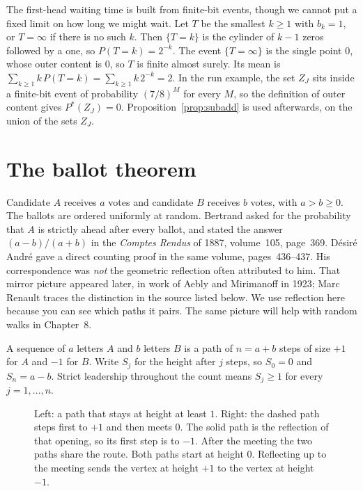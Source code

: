 The first-head waiting time is built from finite-bit events, though we cannot put a fixed limit on how long we might wait. Let $T$ be the smallest $k\ge1$ with $b_k=1$, or $T=\infty$ if there is no such $k$. Then $\{T=k\}$ is the cylinder of $k-1$ zeros followed by a one, so $P(T=k)=2^{-k}$. The event $\{T=\infty\}$ is the single point $0$, whose outer content is $0$, so $T$ is finite almost surely. Its mean is $\sum_{k\ge1}k\,P(T=k)=\sum_{k\ge1}k\,2^{-k}=2$. In the run example, the set $Z_J$ sits inside a finite-bit event of probability $(7/8)^M$ for every $M$, so the definition of outer content gives $P^*(Z_J)=0$. Proposition~\ref{prop:subadd} is used afterwards, on the union of the sets $Z_J$.

\section{The ballot theorem}

Candidate $A$ receives $a$ votes and candidate $B$ receives $b$ votes, with $a>b\ge0$. The ballots are ordered uniformly at random. Bertrand asked for the probability that $A$ is strictly ahead after every ballot, and stated the answer $(a-b)/(a+b)$ in the \emph{Comptes Rendus} of 1887, volume~105, page~369. D\'esir\'e Andr\'e gave a direct counting proof in the same volume, pages~436--437. His correspondence was \emph{not} the geometric reflection often attributed to him. That mirror picture appeared later, in work of Aebly and Mirimanoff in 1923; Marc Renault traces the distinction in the source listed below. We use reflection here because you can see which paths it pairs. The same picture will help with random walks in Chapter~8.

A sequence of $a$ letters $A$ and $b$ letters $B$ is a path of $n=a+b$ steps of size $+1$ for $A$ and $-1$ for $B$. Write $S_j$ for the height after $j$ steps, so $S_0=0$ and $S_n=a-b$. Strict leadership throughout the count means $S_j\ge1$ for every $j=1,\ldots,n$.

\begin{figure}[ht]
\centering
{}
\caption{Left: a path that stays at height at least $1$. Right: the dashed path steps first to $+1$ and then meets $0$. The solid path is the reflection of that opening, so its first step is to $-1$. After the meeting the two paths share the route. Both paths start at height $0$. Reflecting up to the meeting sends the vertex at height $+1$ to the vertex at height $-1$.}
\label{fig:ballot}
\end{figure}

